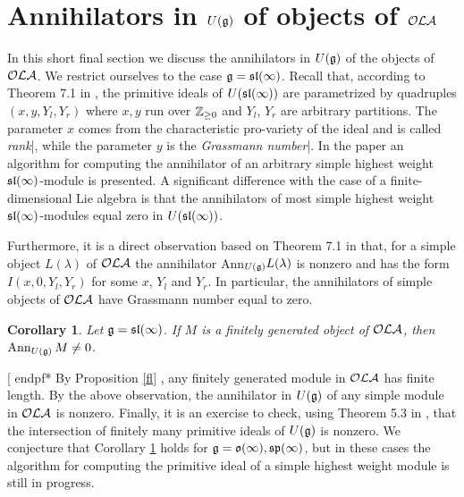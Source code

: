 \documentclass[12pt]{amsart}
\makeatletter
\def\mathbb{\Bbb}
\def\mathfrak{\frak}
\newenvironment{proof}{%
         \@ifnextchar[{%
                       \expandafter\let\expandafter\end@proof
                         \csname endpf*\endcsname
                         \my@proof
                      }{\let\end@proof\endpf\pf}%
        }{\end@proof}
\def\my@proof[#1]{\@nameuse{pf*}{#1}}
\def\emph#1{{\em #1}}
\def\mathcal{\cal}
\def\@putname#1#2#3#4{\def\@@ref{#3}\let\old@bf\bf
        \def\bf##1{\old@bf\if?\noexpand##1?{#4}\else##1\fi}%
        #1{#2}%
        \let\bf\old@bf}
\def\@putname#1#2#3#4{\def\@@ref{#3}\let\old@bf\bf    %
        \let\old@reset@font\reset@font                  %
        \def\bf##1{\old@bf\if?\noexpand##1?{#4}\else##1\fi}%
        \def\reset@font##1##2{\old@reset@font##1\if?\noexpand##2?{#4}\else##2\fi}#1{#2}%
        \let\bf\old@bf\let\reset@font\old@reset@font}
\let\my@ref=\ref
\def\ref#1{\@putname\my@ref{#1}{#1}{\tiny\rm\@@ref}}
\let\my@cite=\cite
\def\cite#1{\@putname\my@cite{#1}{\@citeb}{\tiny\rm\@@ref}}
\theoremstyle{plain} %
\let\emphOrig\emph
\def\eatToBar#1|{}
\def\emphToIndexSLASH#1\/{\index{#1}\eatToBar}
\def\emphToIndexDOTSLASH#1.\/{\emphToIndexSLASH #1\/}
\def\emphAndIndex#1{\emphOrig{#1}{\emphToIndexDOTSLASH #1.\/|}}
\let\emph\emphAndIndex
\numberwithin{equation}{section}
\theoremstyle{definition}
\theoremstyle{remark}
\theoremstyle{plain} %
\newtheorem{corollary}[definition]{Corollary}
\newcommand{\fg}{\mathfrak{g}}
\makeatother
\begin{document}
\section{Annihilators in $U(\fg)$ of objects of $\mathcal{OLA}$}




In this short final section we discuss the annihilators in $U(\fg)$ of the objects of $\mathcal{OLA}$. We restrict ourselves to the case $\fg=\mathfrak{sl}(\infty)$. Recall that, according to Theorem 7.1 in \cite{PP2}, the primitive ideals of $U(\mathfrak{sl}(\infty))$ are parametrized by quadruples $(x, y, Y_l, Y_r)$  where $x, y$ run over $\mathbb{Z}_{\geq0}$ and $Y_l$, $Y_r$ are arbitrary partitions. The parameter $x$ comes from the characteristic pro-variety of the ideal \cite{PP1} and is called \emph{rank}, while the parameter $y$ is the \emph{Grassmann number}. In the paper \cite{PP3} an algorithm for computing the annihilator of an arbitrary  simple highest weight $\mathfrak{sl}(\infty)$-module is presented. A significant difference with the case of a finite-dimensional Lie algebra is that the annihilators of most simple highest weight $\mathfrak{sl}(\infty)$-modules equal zero in $U(\mathfrak{sl}(\infty))$.


Furthermore, it is a direct observation based  on Theorem 7.1 in \cite{PP2} that, for  a simple object $L(\lambda)$ of $\mathcal{OLA}$ the annihilator Ann$_{U(\fg)}L(\lambda)$ is nonzero and has the form $I(x,0,Y_l,Y_r)$ for some $x$, $Y_l$ and $Y_r$. In particular,  the annihilators of simple objects of $\mathcal{OLA}$ have Grassmann number equal to zero.
\begin{corollary}\label{last}
Let $\fg=\mathfrak{sl}(\infty)$. If $M$ is a finitely generated object of $\mathcal{OLA}$, then $\operatorname{Ann}_{U(\fg)}M\neq0$.
\end{corollary} 
\begin{proof} By Proposition \ref{fl}, any finitely generated module in $\mathcal{OLA}$ has finite length. By the above observation, the annihilator in $U(\fg)$ of any simple module in $\mathcal{OLA}$ is nonzero. Finally, it is an exercise to check, using Theorem 5.3 in \cite{PP2},  that the intersection of finitely many primitive ideals of $U(\fg)$ is nonzero.
\end{proof}
We conjecture that Corollary \ref{last} holds for $\fg=\mathfrak{o}(\infty), \mathfrak{sp}(\infty)$, but in these cases the algorithm for computing the primitive ideal of a simple highest weight module is still in progress.
\end{document}
